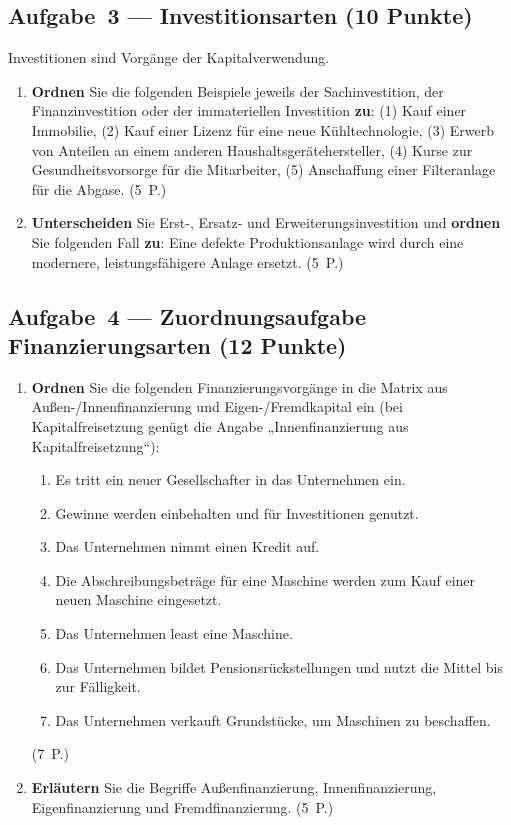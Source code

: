 \documentclass[11pt, a4paper]{article}
\begin{document}
\subsection*{Aufgabe~3 --- Investitionsarten (10 Punkte)}

Investitionen sind Vorgänge der Kapitalverwendung.

\begin{enumerate}[label=(\alph*)]
  \item \textbf{Ordnen} Sie die folgenden Beispiele jeweils der Sachinvestition,
    der Finanzinvestition oder der immateriellen Investition \textbf{zu}:
    (1) Kauf einer Immobilie, (2) Kauf einer Lizenz für eine neue Kühltechnologie,
    (3) Erwerb von Anteilen an einem anderen Haushaltsgerätehersteller,
    (4) Kurse zur Gesundheitsvorsorge für die Mitarbeiter,
    (5) Anschaffung einer Filteranlage für die Abgase. \hfill (5~P.)
  \item \textbf{Unterscheiden} Sie Erst-, Ersatz- und Erweiterungsinvestition und
    \textbf{ordnen} Sie folgenden Fall \textbf{zu}: Eine defekte Produktionsanlage wird
    durch eine modernere, leistungsfähigere Anlage ersetzt. \hfill (5~P.)
\end{enumerate}

\subsection*{Aufgabe~4 --- Zuordnungsaufgabe Finanzierungsarten (12 Punkte)}

\begin{enumerate}[label=(\alph*)]
  \item \textbf{Ordnen} Sie die folgenden Finanzierungsvorgänge in die Matrix aus
    Außen-/Innenfinanzierung und Eigen-/Fremdkapital ein (bei Kapitalfreisetzung genügt
    die Angabe „Innenfinanzierung aus Kapitalfreisetzung``):
    \begin{enumerate}[label=\arabic*.]
      \item Es tritt ein neuer Gesellschafter in das Unternehmen ein.
      \item Gewinne werden einbehalten und für Investitionen genutzt.
      \item Das Unternehmen nimmt einen Kredit auf.
      \item Die Abschreibungsbeträge für eine Maschine werden zum Kauf einer neuen
        Maschine eingesetzt.
      \item Das Unternehmen least eine Maschine.
      \item Das Unternehmen bildet Pensionsrückstellungen und nutzt die Mittel bis zur
        Fälligkeit.
      \item Das Unternehmen verkauft Grundstücke, um Maschinen zu beschaffen.
    \end{enumerate} \hfill (7~P.)
  \item \textbf{Erläutern} Sie die Begriffe Außenfinanzierung, Innenfinanzierung,
    Eigenfinanzierung und Fremdfinanzierung. \hfill (5~P.)
\end{enumerate}
\end{document}
